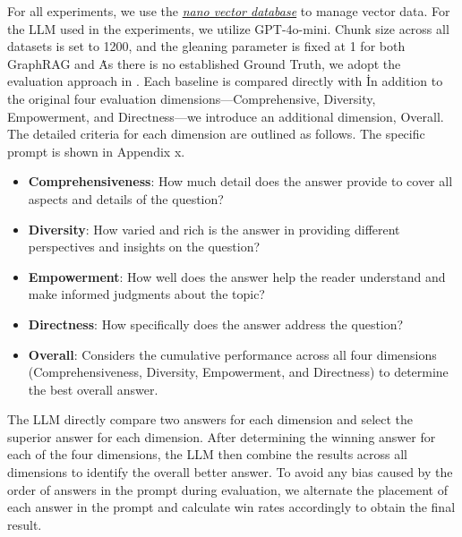For all experiments, we use the \href{https://github.com/gusye1234/nano-vectordb}{\textit{nano vector database}} to manage vector data. For the LLM used in the experiments, we utilize GPT-4o-mini. Chunk size across all datasets is set to 1200, and the gleaning parameter is fixed at 1 for both GraphRAG and \model\. As there is no established Ground Truth, we adopt the evaluation approach in \cite{edge2024local}. Each baseline is compared directly with \model\. In addition to the original four evaluation dimensions—Comprehensive, Diversity, Empowerment, and Directness—we introduce an additional dimension, Overall. The detailed criteria for each dimension are outlined as follows. The specific prompt is shown in Appendix x.

\begin{itemize}
    \item \textbf{Comprehensiveness}: How much detail does the answer provide to cover all aspects and details of the question?
    \item \textbf{Diversity}: How varied and rich is the answer in providing different perspectives and insights on the question?
    \item \textbf{Empowerment}: How well does the answer help the reader understand and make informed judgments about the topic?
    \item \textbf{Directness}: How specifically does the answer address the question?
    \item \textbf{Overall}: Considers the cumulative performance across all four dimensions (Comprehensiveness, Diversity, Empowerment, and Directness) to determine the best overall answer.
\end{itemize}

 The LLM directly compare two answers for each dimension and select the superior answer for each dimension. After determining the winning answer for each of the four dimensions, the LLM then combine the results across all dimensions to identify the overall better answer. To avoid any bias caused by the order of answers in the prompt during evaluation, we alternate the placement of each answer in the prompt and calculate win rates accordingly to obtain the final result.

